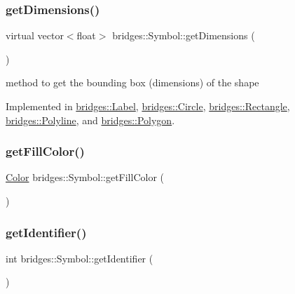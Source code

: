 \subsubsection{\texorpdfstring{getDimensions()}{getDimensions()}}
{\footnotesize\ttfamily virtual vector$<$float$>$ bridges\+::\+Symbol\+::get\+Dimensions (\begin{DoxyParamCaption}{ }\end{DoxyParamCaption})\hspace{0.3cm}{\ttfamily [pure virtual]}}

method to get the bounding box (dimensions) of the shape 

Implemented in \mbox{\hyperlink{classbridges_1_1_label_a97d5638f629edbd6733b8f8572ca42ba}{bridges\+::\+Label}}, \mbox{\hyperlink{classbridges_1_1_circle_a06e97818128abf9b9caa72aa4d05a704}{bridges\+::\+Circle}}, \mbox{\hyperlink{classbridges_1_1_rectangle_a459587616a9674f6f0f02bac08589e23}{bridges\+::\+Rectangle}}, \mbox{\hyperlink{classbridges_1_1_polyline_aa0ce633fa1bb6460f507fe98026de443}{bridges\+::\+Polyline}}, and \mbox{\hyperlink{classbridges_1_1_polygon_a6ad07473cb57633eca62a3f6832ea08c}{bridges\+::\+Polygon}}.

\mbox{\label{classbridges_1_1_symbol_affd9e9f49524a920d53a490782fab9c9}} 
\subsubsection{\texorpdfstring{getFillColor()}{getFillColor()}}
{\footnotesize\ttfamily \mbox{\hyperlink{classbridges_1_1_color}{Color}} bridges\+::\+Symbol\+::get\+Fill\+Color (\begin{DoxyParamCaption}{ }\end{DoxyParamCaption})\hspace{0.3cm}{\ttfamily [inline]}}

\mbox{\label{classbridges_1_1_symbol_a6006dfc7fcaeff3dbead8bcf647ccff6}} 
\subsubsection{\texorpdfstring{getIdentifier()}{getIdentifier()}}
{\footnotesize\ttfamily int bridges\+::\+Symbol\+::get\+Identifier (\begin{DoxyParamCaption}{ }\end{DoxyParamCaption})\hspace{0.3cm}{\ttfamily [inline]}}

